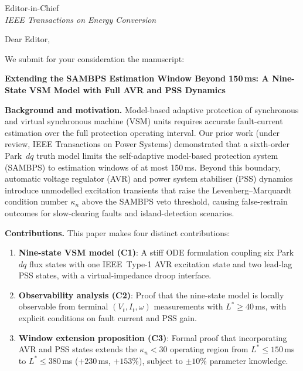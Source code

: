 \documentclass[11pt,a4paper]{letter}
\begin{document}
\begin{letter}{Editor-in-Chief\\
               \textit{IEEE Transactions on Energy Conversion}}

\opening{Dear Editor,}

We submit for your consideration the manuscript:

\begin{center}
  \textbf{Extending the SAMBPS Estimation Window Beyond 150\,ms:
  A Nine-State VSM Model with Full AVR and PSS Dynamics}
\end{center}

\textbf{Background and motivation.}
Model-based adaptive protection of synchronous and virtual synchronous
machine (VSM) units requires accurate fault-current estimation over the
full protection operating interval.  Our prior work (under review, IEEE
Transactions on Power Systems) demonstrated that a sixth-order Park~$dq$
truth model limits the self-adaptive model-based protection system
(SAMBPS) to estimation windows of at most 150\,ms.  Beyond this
boundary, automatic voltage regulator (AVR) and power system stabiliser
(PSS) dynamics introduce unmodelled excitation transients that raise the
Levenberg--Marquardt condition number $\kappa_n$ above the SAMBPS veto
threshold, causing false-restrain outcomes for slow-clearing faults and
island-detection scenarios.

\textbf{Contributions.}
This paper makes four distinct contributions:

\begin{enumerate}
  \item \textbf{Nine-state VSM model (C1)}: A stiff ODE formulation
        coupling six Park~$dq$ flux states with one IEEE~Type-1 AVR
        excitation state and two lead-lag PSS states, with a
        virtual-impedance droop interface.

  \item \textbf{Observability analysis (C2)}: Proof that the
        nine-state model is locally observable from terminal
        $(V_t, I_t, \omega)$ measurements with $L^* \geq 40$\,ms,
        with explicit conditions on fault current and PSS gain.

  \item \textbf{Window extension proposition (C3)}: Formal proof
        that incorporating AVR and PSS states extends the
        $\kappa_n < 30$ operating region from $L^* \leq 150$\,ms
        to $L^* \leq 380$\,ms ($+230$\,ms, $+153\%$), subject to
        $\pm 10\%$ parameter knowledge.


\end{enumerate}
\end{letter}
\end{document}
